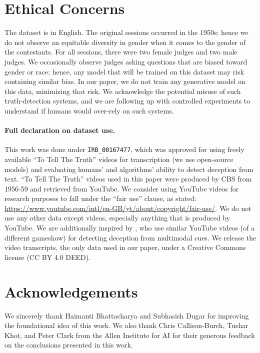\section{Ethical Concerns} 
The dataset is in English. The original sessions occurred in the 1950s; hence we do not observe an equitable diversity in gender when it comes to the gender of the contestants. For all sessions, there were two female judges and two male judges. We occasionally observe judges asking questions that are biased toward gender or race; hence, any model that will be trained on this dataset may risk containing similar bias. In our paper, we do not train any generative model on this data, minimizing that risk. We acknowledge the potential misuse of such truth-detection systems, and we are following up with controlled experiments to understand if humans would over-rely on such systems.

\paragraph{Full declaration on dataset use.} This work was done under \texttt{IRB\_00167477}, which was approved for using freely available ``To Tell The Truth'' videos for transcription (we use open-source models) and evaluating humans' and algorithms' ability to detect deception from text.
``To Tell The Truth'' videos used in this paper were produced by CBS from 1956-59 and retrieved from YouTube. We consider using YouTube videos for research purposes to fall under the ``fair use'' clause, as stated: \url{https://www.youtube.com/intl/en-GB/yt/about/copyright/fair-use/}. We do not use any other data except videos, especially anything that is produced by YouTube.
We are additionally inspired by \citet{soldner2019box}, who use similar YouTube videos (of a different gameshow) for detecting deception from multimodal cues.
We release the video transcripts, the only data used in our paper, under a Creative Commons license (CC BY 4.0 DEED).

\section*{Acknowledgements} We sincerely thank Haimanti Bhattacharya and Subhasish Dugar for improving the foundational idea of this work. We also thank Chris Callison-Burch, Tushar Khot, and Peter Clark from the Allen Institute for AI for their generous feedback on the conclusions presented in this work. 